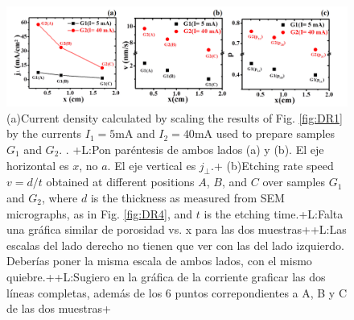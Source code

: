 \documentclass{article}
\newcommand{\notaL}[1]{{\color{blue}+L:#1+}}
\begin{document}
\begin{figure}
  \centering
   \includegraphics[width=\textwidth]{Images/grinJDR}
  \caption{(a)Current density calculated by scaling the results of
    Fig. \ref{fig:DR1} by the currents $I_1=5\text{mA}$ and
    $I_2=40\text{mA}$ used to prepare samples $G_1$ and $G_2$.
. \notaL{Pon paréntesis de ambos
      lados (a) y (b). El eje horizontal es $x$, no $a$. El eje
      vertical es $j_\perp$.}
    (b)Etching rate speed $v=d/t$ obtained at different positions $A$, $B$,
    and $C$ over samples $G_1$ and $G_2$, where $d$ is the thickness
    as measured from SEM micrographs, as in Fig. \ref{fig:DR4},
    and $t$ is the etching time.\notaL{Falta una gráfica similar de
      porosidad vs. x para las dos muestras}\notaL{Las escalas del
      lado derecho no tienen que ver con las del lado
      izquierdo. Deberías poner la misma escala de ambos lados, con el
    mismo quiebre.}\notaL{Sugiero en la gráfica de la corriente
    graficar las dos líneas completas, además de los 6 puntos
    correpondientes a A, B y C de las dos muestras}}
  \label{fig:JDR}
\end{figure}
\end{document}

